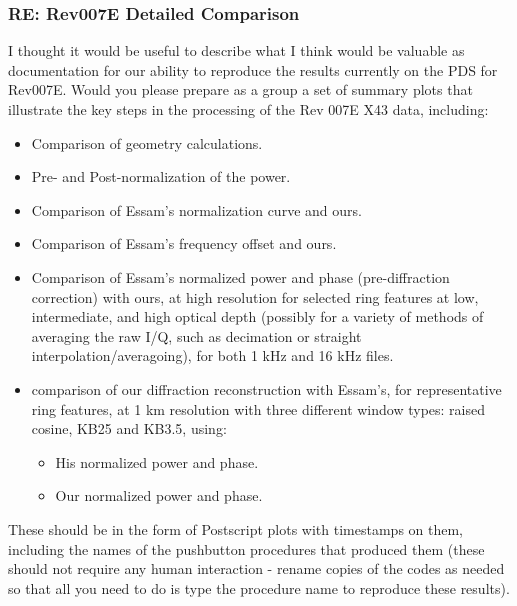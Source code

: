 \documentclass[crop=false,class=article,oneside]{standalone}
\begin{document}
\subsubsection{\footnotesize RE: Rev007E Detailed Comparison}
I thought it would be useful to describe what I think would be valuable as documentation for our ability to reproduce the results currently on the PDS for Rev007E. Would you please prepare as a group a set of summary plots that illustrate the key steps in the processing of the Rev 007E X43 data, including:
\begin{itemize}
    \item Comparison of geometry calculations.
    \item Pre- and Post-normalization of the power.
    \item Comparison of Essam's normalization curve and ours.
    \item Comparison of Essam's frequency offset and ours.
    \item Comparison of Essam's normalized power and phase (pre-diffraction correction) with ours, at high resolution for selected ring features at low, intermediate, and high optical depth (possibly for a variety of methods of averaging the raw I/Q, such as decimation or straight interpolation/averagoing), for both 1 kHz and 16 kHz files.
    \item comparison of our diffraction reconstruction with Essam's, for representative ring features, at 1 km resolution with three different window types: raised cosine, KB25 and KB3.5, using:
    \begin{itemize}
        \item His normalized power and phase.
        \item Our normalized power and phase.
    \end{itemize}
\end{itemize}
These should be in the form of Postscript plots with timestamps on them, including the names of the pushbutton procedures that produced them (these should not require any human interaction - rename copies of the codes as needed so that all you need to do is type the procedure name to reproduce these results).
\end{document}
